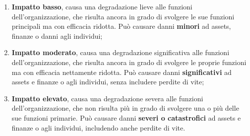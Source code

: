 \documentclass[14pt]{extarticle}
\begin{document}
\begin{enumerate}
    
    \item \textbf{Impatto basso}, causa una degradazione lieve alle funzioni \\
    dell'organizzazione, che risulta ancora in grado di svolgere le sue funzioni
    principali ma con efficacia ridotta. Può causare danni \textbf{minori} ad
    assets, finanze o danni agli individui;
    \item \textbf{Impatto moderato}, causa una degradazione significativa alle
    funzioni dell'organizzazione, che risulta ancora in grado di svolgere le
    proprie funzioni ma con efficacia nettamente ridotta. Può causare danni
    \textbf{significativi} ad assets e finanze o agli individui, senza includere
    perdite di vite;
    \item \textbf{Impatto elevato}, causa una degradazione severa alle funzioni
    dell'organizzazione, che non risulta più in grado di svolgere una o più
    delle sue funzioni primarie. Può causare danni \textbf{severi o
    catastrofici} ad assets e finanze o agli individui, includendo anche perdite
    di vite. 

\end{enumerate}
\end{document}
